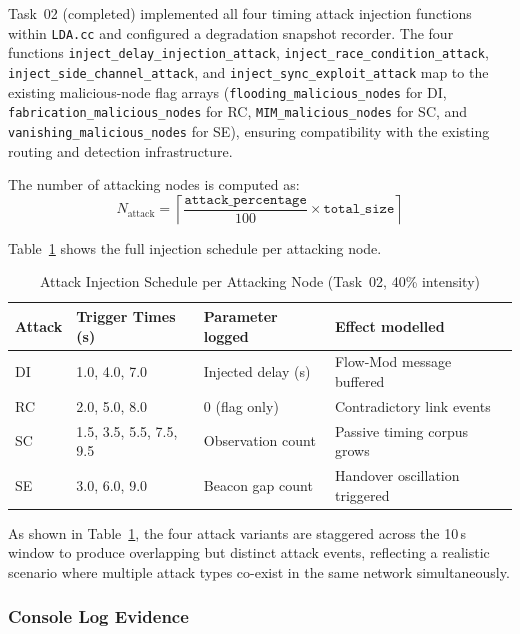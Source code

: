 Task~02 (completed) implemented all four timing attack
injection functions within \texttt{LDA.cc} and
configured a degradation snapshot recorder. The four
functions 
\texttt{inject\_de\-lay\_in\-jec\-tion\_at\-tack},
\texttt{inject\_race\_con\-di\-tion\_at\-tack},
\texttt{inject\_side\_chan\-nel\_at\-tack}, and
\texttt{inject\_sync\_ex\-ploit\_at\-tack}
map to the existing malicious-node flag arrays
(\texttt{flood\-ing\_ma\-li\-cious\_nodes} for DI,
\texttt{fab\-ri\-ca\-tion\_ma\-li\-cious\_nodes} for RC,
\texttt{MIM\_ma\-li\-cious\_nodes} for SC, and
\texttt{van\-ish\-ing\_ma\-li\-cious\_nodes} for SE),
ensuring compatibility with the existing routing and
detection infrastructure.

The number of attacking nodes is computed as:
\begin{equation*}
N_{\mathrm{attack}} =
\left\lceil
  \frac{\mathtt{attack\_percentage}}{100}
  \times \mathtt{total\_size}
\right\rceil
\end{equation*}

Table~\ref{tab:attack_schedule} shows the full
injection schedule per attacking node.

\begin{table}[htb]
\centering
\caption{Attack Injection Schedule per Attacking Node
(Task~02, 40\% intensity)}
\label{tab:attack_schedule}
\setlength{\tabcolsep}{4pt}
\begin{tabular}{llll}
\hline
\textbf{Attack} & \textbf{Trigger Times (s)} &
\textbf{Parameter logged} & \textbf{Effect modelled} \\
\hline
DI & 1.0, 4.0, 7.0 &
  Injected delay (s) & Flow-Mod message buffered \\
RC & 2.0, 5.0, 8.0 &
  0 (flag only) & Contradictory link events \\
SC & 1.5, 3.5, 5.5, 7.5, 9.5 &
  Observation count & Passive timing corpus grows \\
SE & 3.0, 6.0, 9.0 &
  Beacon gap count & Handover oscillation triggered \\
\hline
\end{tabular}
\end{table}

As shown in Table~\ref{tab:attack_schedule}, the four
attack variants are staggered across the 10\,s window
to produce overlapping but distinct attack events,
reflecting a realistic scenario where multiple attack
types co-exist in the same network simultaneously.

\subsubsection{Console Log Evidence}

